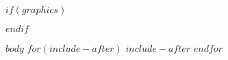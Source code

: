 



$if(graphics)$

\makeatletter
\def\maxwidth{\ifdim\Gin@nat@width>\linewidth\linewidth
\else\Gin@nat@width\fi}
\makeatother
\let\Oldincludegraphics\includegraphics
\renewcommand{\includegraphics}[1]{\Oldincludegraphics[width=\maxwidth]{#1}}
$endif$

\VerbatimFootnotes

\setlength{\parindent}{0pt}
\setlength{\parskip}{6pt plus 2pt minus 1pt}
\setlength{\emergencystretch}{3em}  %
\providecommand{\tightlist}{%
  \setlength{\itemsep}{0pt}\setlength{\parskip}{0pt}}
\VerbatimFootnotes %




\setcounter{page}{1}


\tableofcontents
\newpage

$body$
$for(include-after)$
  $include-after$
$endfor$





